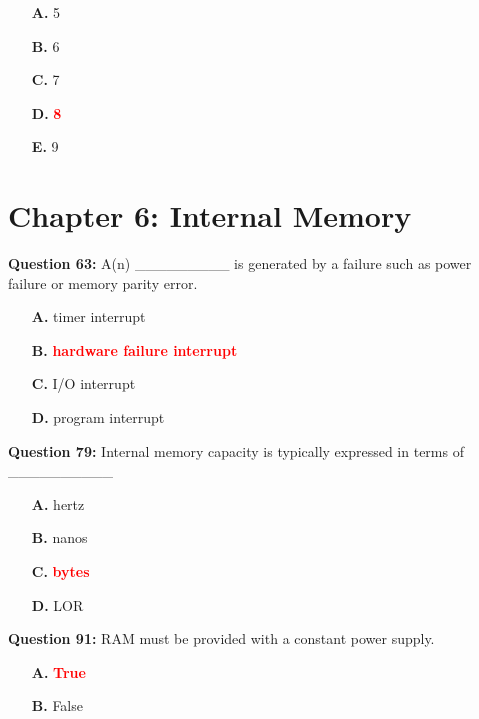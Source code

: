 \documentclass[12pt,a4paper]{article}
\begin{document}
\begin{itemize}
    \item[\textbf{A.}] 5
    \item[\textbf{B.}] 6
    \item[\textbf{C.}] 7
    \item[\textbf{D.}] \textcolor{red}{\textbf{8}}
    \item[\textbf{E.}] 9
\end{itemize}

\vspace{0.5cm}

\section{Chapter 6: Internal Memory}

\textbf{Question 63:} A(n) _________ is generated by a failure such as power failure or memory parity error.

\begin{itemize}
    \item[\textbf{A.}] timer interrupt
    \item[\textbf{B.}] \textcolor{red}{\textbf{hardware failure interrupt}}
    \item[\textbf{C.}] I/O interrupt
    \item[\textbf{D.}] program interrupt
\end{itemize}

\vspace{0.5cm}

\textbf{Question 79:} Internal memory capacity is typically expressed in terms of __________

\begin{itemize}
    \item[\textbf{A.}] hertz
    \item[\textbf{B.}] nanos
    \item[\textbf{C.}] \textcolor{red}{\textbf{bytes}}
    \item[\textbf{D.}] LOR
\end{itemize}

\vspace{0.5cm}

\textbf{Question 91:} RAM must be provided with a constant power supply.

\begin{itemize}
    \item[\textbf{A.}] \textcolor{red}{\textbf{True}}
    \item[\textbf{B.}] False
\end{itemize}
\end{document}
